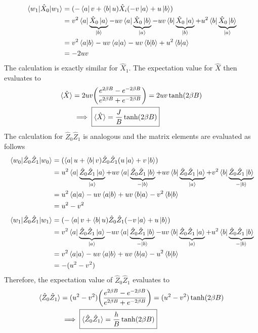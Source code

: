 \documentclass[../journal_main.tex]{subfiles}
\begin{document}
\begin{align*}
    \mel{w_1}{\hat{X}_0}{w_1} & = (-\bra{a}v + \bra{b} u) \hat{X}_i (-v \ket{a} + u \ket{b}) \\
    & = v^2 \bra{a}\underbrace{{\hat{X}_0}\ket{a}}_{\ket{b}} -  uv \bra{a}\underbrace{{\hat{X}_0}\ket{b}}_{\ket{a}} - uv \bra{b}\underbrace{{\hat{X}_0}\ket{a}}_{\ket{b}} + u^2 \bra{b}\underbrace{{\hat{X}_0}\ket{b}}_{\ket{a}} \\ 
    & = v^2 \braket{a}{b} - uv \braket{a}{a} - uv \braket{b}{b} + u^2\braket{b}{a} \\
    & = -2uv
\end{align*} 
The calculation is exactly similar for $\hat{X}_1$. The expectation value for $\hat{X}$  then evaluates to 
\begin{align}
    \langle \hat{X} \rangle & = 2uv \qty(\frac{e^{2\beta B} - e^{-2\beta B}}{e^{2\beta B} + e^{-2\beta B}}) = 2uv \tanh (2\beta B) \nonumber \\ 
    & \implies \boxed{\langle{\hat{X}}\rangle = \frac{J}{B} \tanh(2\beta B)}
    \label{X-hat_expval}
\end{align}
The calculation for $\hat{Z}_0 \hat{Z}_1$ is analogous and the matrix elements are evaluated as follows
\begin{align*}
    \mel{w_0}{\hat{Z}_0 \hat{Z}_1}{w_0} & = (\bra{a} u + \bra{b} v) \hat{Z}_0 \hat{Z}_1 (u \ket{a} + v \ket{b}) \\
    & = u^2 \bra{a}\underbrace{{\hat{Z}_0 \hat{Z}_1}\ket{a}}_{\ket{a}} +  uv \bra{a}\underbrace{{\hat{Z}_0 \hat{Z}_1}\ket{b}}_{-\ket{b}} + uv \bra{b}\underbrace{{\hat{Z}_0 \hat{Z}_1}\ket{a}}_{\ket{a}} + v^2 \bra{b}\underbrace{{\hat{Z}_0 \hat{Z}_1}\ket{b}}_{-\ket{b}} \\ 
    & = u^2 \braket{a}{a} - uv \braket{a}{b} + uv \braket{b}{a} - v^2\braket{b}{b} \\
    & = u^2 - v^2
\end{align*} 
\begin{align*}
    \mel{w_1}{\hat{Z}_0 \hat{Z}_1}{w_1} & = (-\bra{a}v + \bra{b} u) \hat{Z}_0 \hat{Z}_1 (-v \ket{a} + u \ket{b}) \\
    & = v^2 \bra{a}\underbrace{{\hat{Z}_0 \hat{Z}_1}\ket{a}}_{\ket{a}} -  uv \bra{a}\underbrace{{\hat{Z}_0 \hat{Z}_1}\ket{b}}_{-\ket{b}} - uv \bra{b}\underbrace{{\hat{Z}_0 \hat{Z}_1}\ket{a}}_{\ket{a}} + u^2 \bra{b}\underbrace{{\hat{Z}_0 \hat{Z}_1}\ket{b}}_{-\ket{b}} \\ 
    & = v^2 \braket{a}{a} - uv \braket{a}{b} + uv \braket{b}{a} - u^2\braket{b}{b} \\
    & = -(u^2 - v^2)
\end{align*}
Therefore, the expectation value of $\hat{Z}_0 \hat{Z}_1$ evaluates to 
\begin{align}
    \langle \hat{Z}_0 \hat{Z}_1 \rangle & = (u^2-v^2) \qty(\frac{e^{2\beta B} - e^{-2\beta B}}{e^{2\beta B} + e^{-2\beta B}}) = (u^2-v^2) \tanh (2\beta B) \nonumber \\ 
    & \implies \boxed{\langle{\hat{Z}_0 \hat{Z}_1}\rangle = \frac{h}{B} \tanh(2\beta B)}
    \label{ZZ-hat_expval}
\end{align}
\end{document}
